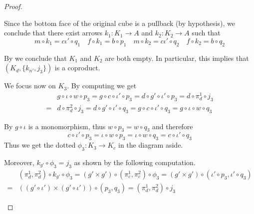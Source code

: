 \documentclass[a4paper,UKenglish,cleveref,pdftex,amsthm,thm-restate,numberwithinsect]{cas-sc}
\theoremstyle{plain}
\theoremstyle{definition}
\def\E{\textbf {\textup{E}}}
\newcommand{\commentato}[1]{ {} }
\newcommand{\id}[1]{\mathsf{id}_{#1}}
\begin{document}
\begin{proof}
\begin{enumerate}
Since the bottom face of the original cube is a pullback (by hypothesis), we conclude that there exist arrows $k_1\colon  K_1\to A$ and $k_2\colon K_2\to A$ such that
\[m\circ k_1= c \iota'\circ q_1 \quad f\circ k_1=b\circ p_1 \quad m\circ k_2=c \iota'\circ q_2 \quad f\circ k_2=b\circ q_2\]

By  we conclude that $K_1$ and $K_2$
are both empty. In particular, this implies that $(K_d, \{k_{n'}, j_3\})$ is a coproduct.


We focus now on $K_3$. By computing we get
	\begin{align*}
	&g\circ \iota \circ w\circ p_3=g\circ c\circ \iota'\circ p_3=d\circ g'\circ \iota'\circ p_3=d\circ \pi^1_d\circ j_3\\=&d\circ \pi^2_d\circ j_3=d\circ g'\circ \iota' \circ q_3=g\circ c\circ \iota'\circ q_3=g\circ \iota \circ w\circ q_3
	\end{align*}

\noindent 
\parbox{3cm}{}\hfill\parbox{9.5cm}{By  $g\circ \iota$ is a monomorphism, thus $w\circ p_3=w\circ q_3$ and therefore
\[c\circ \iota'\circ p_3=\iota\circ w\circ p_3=\iota \circ w\circ q_3=c\circ \iota'\circ q_3\]
Thus we get the dotted $\phi_3\colon K_3\to K_c$ in the diagram aside.}

Moreover, $k_{g'}\circ \phi_3=j_3$ as shown by the following computation.
\begin{align*}
&(\pi^1_d, \pi^2_d)\circ k_{g'}\circ \phi_3=(g'\times g')\circ (\pi^1_c, \pi^2_c)\circ \phi_3=(g'\times g')\circ (\iota'\circ p_3, \iota'\circ q_3)\\=&((g'\circ \iota') \times (g'\circ \iota'))\circ (p_3, q_3)=(\pi^1_d, \pi^2_d)\circ j_3
\end{align*}
 
 \commentato{ 
 
 	\smallskip
 \parbox{7.5cm}{We can go further. The outer part of the diagram on the right commutes, so that we have the dotted $\psi_0\circ K_b\to K_0$.
 Now, on the one hand $\phi_0\circ \psi_0=\id{K_b}$ because if we compute we get
  \[(\pi^1_b, \pi^2_b)\circ \phi_0\circ \psi_0=(p_0, q_0)\circ \psi_0=(\pi^1_b, \pi^2_b)\]}\hfill \parbox{4cm}{\vspace{-.5cm}\xymatrix{K_b \ar[dr]_{(\pi^1_b, \pi^2_b)}  \ar@{>->}@/^.4cm/[rr]^{k_{n'}} \ar@{.>}[r]_{\psi_0}& K_0 \ar@{>->}[r]_{j_0}  \ar[d]^{(p_0, q_0)}& K_d   \ar[d]^{(\pi^1_d, \pi^2_d)} \\
 	& B'\times B' \ar@{>->}[r]_-{n'\times n'} & D'\times D' }
 	}

}
\end{enumerate}
\end{proof}
\end{document}
